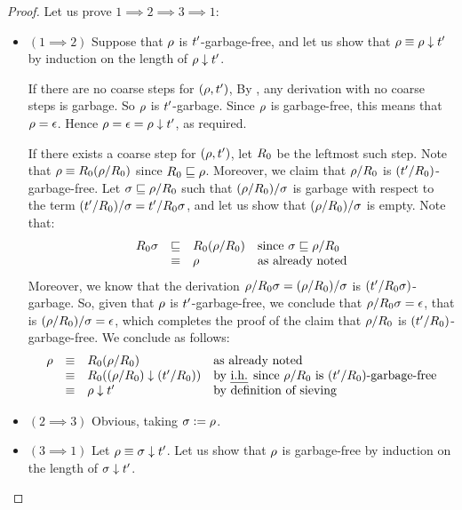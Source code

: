 \begin{proof}
Let us prove $1 \implies 2 \implies 3 \implies 1$:
\begin{itemize}
\item $(1 \implies 2)$
  Suppose that $\rho$ is $t'$-garbage-free,
  and let us show that $\rho \equiv \rho \downarrow t'$
  by induction on the length of $\rho \downarrow t'$.

  If there are no coarse steps for $(\rho,t')$,
  By , any derivation with no coarse steps is garbage.
  So $\rho$ is $t'$-garbage.
  Since $\rho$ is garbage-free, this means that $\rho = \epsilon$.
  Hence $\rho = \epsilon = \rho \downarrow t'$, as required.

  If there exists a coarse step for $(\rho,t')$, let $R_0$ be the leftmost such step.
  Note that $\rho \equiv R_0(\rho/R_0)$ since $R_0 \sqsubseteq \rho$.
  Moreover, we claim that $\rho/R_0$ is $(t'/R_0)$-garbage-free.
  Let $\sigma \sqsubseteq \rho/R_0$ such that $(\rho/R_0)/\sigma$ is garbage
  with respect to the term $(t'/R_0)/\sigma = t'/R_0\sigma$,
  and let us show that $(\rho/R_0)/\sigma$ is empty.
  Note that:
  \[
    \begin{array}{rcll}
    R_0\sigma
    & \sqsubseteq & R_0(\rho/R_0) & \text{since $\sigma \sqsubseteq \rho/R_0$} \\
    & \equiv & \rho                    & \text{as already noted} \\
    \end{array}
  \]
  Moreover, we know that the derivation $\rho/R_0\sigma = (\rho/R_0)/\sigma$ is
  $(t'/R_0\sigma)$-garbage.
  So, given that $\rho$ is $t'$-garbage-free, we conclude that
  $\rho/R_0\sigma = \epsilon$, that is $(\rho/R_0)/\sigma = \epsilon$,
  which completes the proof of the claim that $\rho/R_0$ is $(t'/R_0)$-garbage-free.
  We conclude as follows:
  \[
    \begin{array}{rcll}
      \redseq & \permeq & \redex_0(\redseq/\redex_0)                          & \text{as already noted} \\
              & \permeq & \redex_0((\redseq/\redex_0) \sieve (\tm'/\redex_0)) & \text{by \ih since $\redseq/\redex_0$ is $(\tm'/\redex_0)$-garbage-free} \\
              & \permeq & \redseq \sieve \tm'                                 & \text{by definition of sieving} \\
    \end{array}
  \]
\item $(2 \implies 3)$ Obvious, taking $\sigma := \rho$.
\item $(3 \implies 1)$
  Let $\rho \equiv \sigma \downarrow t'$.
  Let us show that $\rho$ is garbage-free by induction on the length of $\sigma \downarrow t'$.


\end{itemize}
\end{proof}
